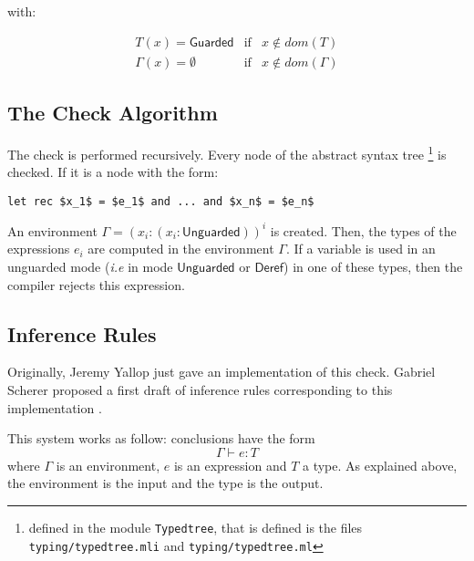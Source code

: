 \documentclass{article}
\newcommand{\Deref}{\mathsf{Deref}}
\newcommand{\Unguarded}{\mathsf{Unguarded}}
\newcommand{\Guarded}{\mathsf{Guarded}}
\begin{document}
with:

\begin{displaymath}
  \begin{array}{lll}
    T(x) = \Guarded       & \text{if} & x \notin dom(T) \\
    \Gamma(x) = \emptyset & \text{if} & x \notin dom(\Gamma)
  \end{array}
\end{displaymath}

\subsection{The Check Algorithm}

The check is performed recursively. Every node of the abstract syntax tree
\footnote{defined in the module \texttt{Typedtree}, that is defined is the
files \texttt{typing/typedtree.mli} and \texttt{typing/typedtree.ml}} is
checked. If it is a node with the form:
\begin{lstlisting}[mathescape=true]
let rec $x_1$ = $e_1$ and ... and $x_n$ = $e_n$
\end{lstlisting}
An environment $\Gamma = (x_i: (x_i: \Unguarded))^i$ is created.
Then, the types of the expressions $e_i$ are computed in the environment
$\Gamma$. If a variable is used in an unguarded mode (\textit{i.e} in mode
$\Unguarded$ or $\Deref$) in one of these types, then the compiler rejects this
expression.

\subsection{Inference Rules}
Originally, Jeremy Yallop just gave an implementation of this
check. Gabriel Scherer proposed a first draft of inference rules
corresponding to this implementation \cite{GascheComment1, GascheComment2}.

This system works as follow: conclusions have the form
$$\Gamma \vdash e: T$$
where $\Gamma$ is an environment, $e$ is an expression and $T$ a type. As
explained above, the environment is the input and the type is the output.
\end{document}
